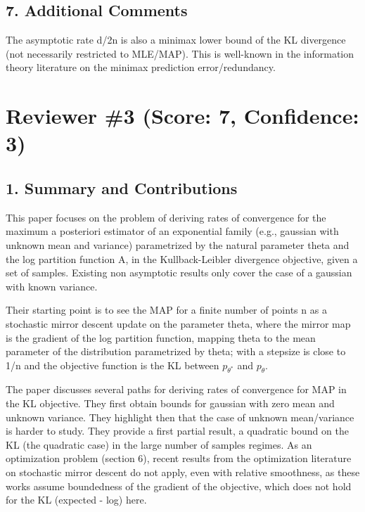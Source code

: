 \subsection*{7. Additional Comments}

The asymptotic rate d/2n is also a minimax lower bound of the KL divergence (not necessarily restricted to MLE/MAP). This is well-known in the information theory literature on the minimax prediction error/redundancy.



























\newpage
\section*{Reviewer \#3 (Score: 7, Confidence: 3)}

\subsection*{1. Summary and Contributions}

This paper focuses on the problem of deriving rates of convergence for the maximum a posteriori estimator of an exponential family (e.g., gaussian with unknown mean and variance) parametrized by the natural parameter theta and the log partition function A, in the Kullback-Leibler divergence objective, given a set of samples. Existing non asymptotic results only cover the case of a gaussian with known variance.

Their starting point is to see the MAP for a finite number of points n as a stochastic mirror descent update on the parameter theta, where the mirror map is the gradient of the log partition function, mapping theta to the mean parameter of the distribution parametrized by theta; with a stepsize is close to 1/n and the objective function is the KL between $p_{\theta^*}$ and $p_\theta$.

The paper discusses several paths for deriving rates of convergence for MAP in the KL objective. They first obtain bounds for gaussian with zero mean and unknown variance. They highlight then that the case of unknown mean/variance is harder to study. They provide a first partial result, a quadratic bound on the KL (the quadratic case) in the large number of samples regimes. As an optimization problem (section 6), recent results from the optimization literature on stochastic mirror descent do not apply, even with relative smoothness, as these works assume boundedness of the gradient of the objective, which does not hold for the KL (expected - log) here.

